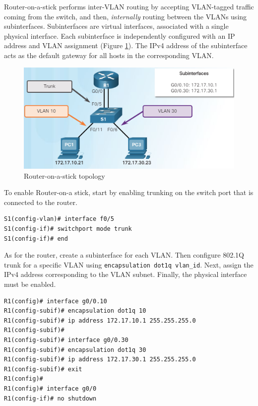 Router-on-a-stick performs inter-VLAN routing by accepting VLAN-tagged traffic coming from the switch, and then, \emph{internally} routing between the VLANs using subinterfaces. Subinterfaces are virtual interfaces, associated with a single physical interface. Each subinterface is independently configured with an IP address and VLAN assignment (Figure \ref{InterVLAN}). The IPv4 address of the subinterface acts as the default gateway for all hosts in the corresponding VLAN.\\

\begin{figure}[hbtp]
\caption{Router-on-a-stick topology}\label{InterVLAN}
\centering
\includegraphics[scale=1]{pictures/InterVLAN.PNG}
\end{figure}


To enable Router-on-a stick, start by enabling trunking on the switch port that is connected to the router.

\begin{verbatim}
S1(config-vlan)# interface f0/5
S1(config-if)# switchport mode trunk
S1(config-if)# end
\end{verbatim}

As for the router, create a subinterface for each VLAN. Then configure 802.1Q trunk for a specific VLAN using \verb|encapsulation dot1q vlan_id|. Next, assign the IPv4 address corresponding to the VLAN subnet. Finally, the physical interface must be enabled. 

\begin{verbatim}
R1(config)# interface g0/0.10
R1(config-subif)# encapsulation dot1q 10
R1(config-subif)# ip address 172.17.10.1 255.255.255.0
R1(config-subif)# 
R1(config-subif)# interface g0/0.30
R1(config-subif)# encapsulation dot1q 30
R1(config-subif)# ip address 172.17.30.1 255.255.255.0
R1(config-subif)# exit
R1(config)# 
R1(config)# interface g0/0
R1(config-if)# no shutdown
\end{verbatim}


